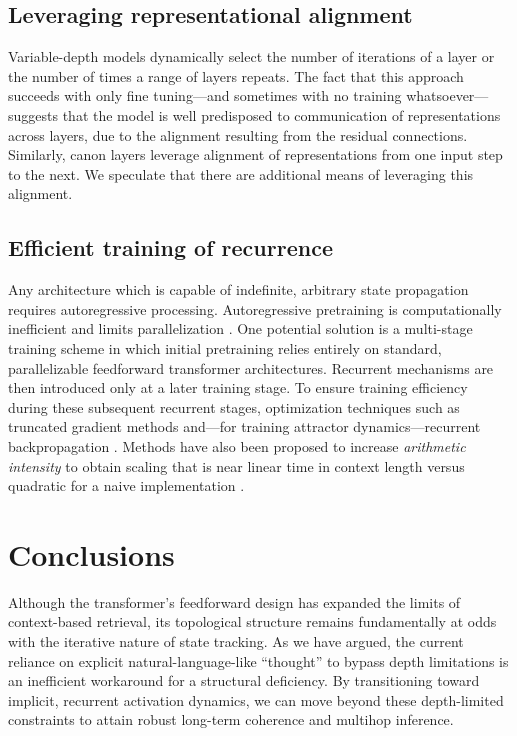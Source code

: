 \documentclass{article}
\begin{document}
\subsection{Leveraging representational alignment}
Variable-depth models dynamically select the number of iterations of a layer or
the number of times a range of layers repeats. The fact that this approach succeeds
with only fine tuning---and sometimes with no training whatsoever---suggests that 
the model is well predisposed to communication of representations across layers,
due to the alignment resulting from the residual connections. Similarly,
canon layers \citep{allenzhu2025physicslanguagemodels1} leverage alignment of
representations from one input step to the next. We speculate that there are
additional means of leveraging this alignment.

\subsection{Efficient training of recurrence}
Any architecture which is capable of indefinite, arbitrary state propagation 
requires autoregressive processing. Autoregressive pretraining is 
computationally inefficient and limits parallelization \citep{chevalier2023adaptinglanguagemodelscompress}.  One potential solution is
a multi-stage training scheme in which initial pretraining relies entirely on
standard, parallelizable feedforward transformer architectures.
Recurrent mechanisms are then introduced only at a later training stage. 
To ensure training efficiency during these subsequent recurrent stages, 
optimization techniques such as truncated gradient methods 
and---for training attractor dynamics---recurrent backpropagation 
\citep{almeida1987learning,pineda1987generalization,liao2018}.
Methods have also been proposed to increase \emph{arithmetic intensity} to obtain scaling
that is near linear time in context length versus quadratic for a naive implementation
\citep{oncescu2026}.

\section{Conclusions}
Although the transformer’s feedforward design has expanded the limits of context-based
retrieval, its topological structure remains fundamentally at odds with the 
iterative nature of state tracking. As we have argued, the current reliance on 
explicit natural-language-like ``thought'' to bypass depth limitations is an inefficient workaround for a structural deficiency. By transitioning toward implicit, recurrent activation dynamics, we can move beyond these depth-limited constraints to attain 
robust long-term coherence and multihop inference.
\end{document}
